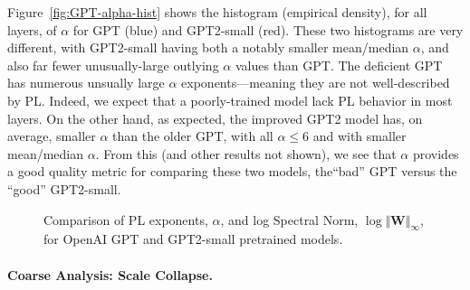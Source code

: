 Figure~\ref{fig:GPT-alpha-hist} shows the histogram (empirical density), for all layers, of $\alpha$ for GPT (blue) and GPT2-small (red).  
These two histograms are very different, with GPT2-small having both a notably smaller mean/median $\alpha$, and also far fewer unusually-large outlying $\alpha$ values than GPT.
The deficient GPT has numerous unsually large $\alpha$ exponents---meaning they are not well-described by PL.
Indeed, we expect that a poorly-trained model lack PL behavior in most layers.
On the other hand, as expected, the improved GPT2 model has, on average, smaller $\alpha$ than the older GPT, with all $\alpha\le6$ and with smaller mean/median $\alpha$.  
From this (and other results not shown), we see that $\alpha$ provides a good quality metric for comparing these two models, the``bad'' GPT versus the ``good'' GPT2-small.

\begin{figure}
    \centering
   \caption{Comparison of PL exponents, $\alpha$, and log Spectral Norm, $\log\Vert\mathbf{W}\Vert_{\infty}$, for OpenAI GPT and GPT2-small pretrained models.}
\label{fig:GPT-hist}
\end{figure}


\paragraph{Coarse Analysis: Scale Collapse.}

